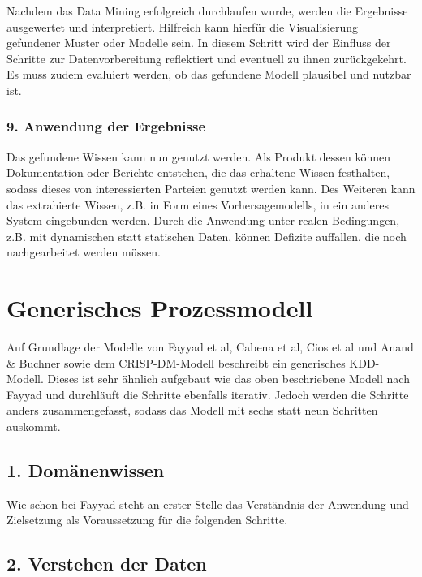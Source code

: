 Nachdem das Data Mining erfolgreich durchlaufen wurde, werden die Ergebnisse ausgewertet und interpretiert. Hilfreich kann hierfür die Visualisierung gefundener Muster oder Modelle sein. In diesem Schritt wird der Einfluss der Schritte zur Datenvorbereitung reflektiert und eventuell zu ihnen zurückgekehrt. Es muss zudem evaluiert werden, ob das gefundene Modell plausibel und nutzbar ist. \cite{Fayyad:1996,Maimon:2010}

\subsubsection{9. Anwendung der Ergebnisse} %

Das gefundene Wissen kann nun genutzt werden. Als Produkt dessen können Dokumentation oder Berichte entstehen, die das erhaltene Wissen festhalten, sodass dieses von interessierten Parteien genutzt werden kann. Des Weiteren kann das extrahierte Wissen, z.B. in Form eines Vorhersagemodells, in ein anderes System eingebunden werden. Durch die Anwendung unter realen Bedingungen, z.B. mit dynamischen statt statischen Daten, können Defizite auffallen, die noch nachgearbeitet werden müssen. \cite{Fayyad:1996,Maimon:2010}

\section{Generisches Prozessmodell}

Auf Grundlage der Modelle von Fayyad et al, Cabena et al, Cios et al und Anand \& Buchner sowie dem CRISP-DM-Modell beschreibt \cite{Kurgan:2006} ein generisches KDD-Modell. Dieses ist sehr ähnlich aufgebaut wie das oben beschriebene Modell nach Fayyad und durchläuft die Schritte ebenfalls iterativ. Jedoch werden die Schritte anders zusammengefasst, sodass das Modell mit sechs statt neun Schritten auskommt. 

\subsection{1. Domänenwissen} %

Wie schon bei Fayyad steht an erster Stelle das Verständnis der Anwendung und Zielsetzung als Voraussetzung für die folgenden Schritte.

\subsection{2. Verstehen der Daten} %

